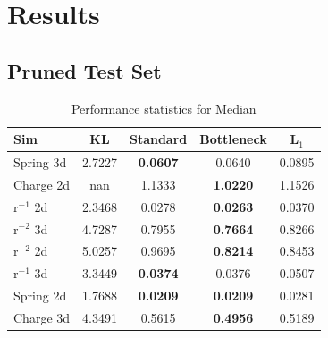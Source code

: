 \documentclass[11pt]{article}
\begin{document}
\section{Results}
\subsection{Pruned Test Set}
\begin{table}[h]
    \centering
    \begin{tabular}{lcccc}
    \hline
    Sim & KL & Standard & Bottleneck & L$_{1}$ \\
    \hline
    Spring 3d & 2.7227 & \textbf{0.0607} & 0.0640 & 0.0895 \\
    Charge 2d & nan & 1.1333 & \textbf{1.0220} & 1.1526 \\
    r$^{-1}$ 2d & 2.3468 & 0.0278 & \textbf{0.0263} & 0.0370 \\
    r$^{-2}$ 3d & 4.7287 & 0.7955 & \textbf{0.7664} & 0.8266 \\
    r$^{-2}$ 2d & 5.0257 & 0.9695 & \textbf{0.8214} & 0.8453 \\
    r$^{-1}$ 3d & 3.3449 & \textbf{0.0374} & 0.0376 & 0.0507 \\
    Spring 2d & 1.7688 & \textbf{0.0209} & \textbf{0.0209} & 0.0281 \\
    Charge 3d & 4.3491 & 0.5615 & \textbf{0.4956} & 0.5189 \\
    \hline
    \end{tabular}
    \caption{Performance statistics for Median}
    \label{tab:Median}
    \end{table}
    
\end{document}

